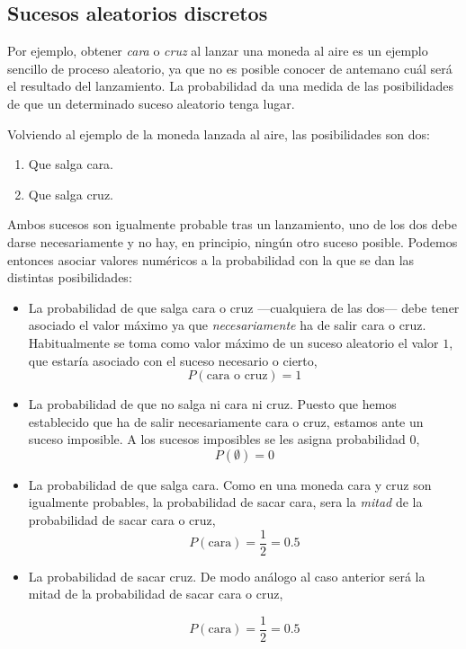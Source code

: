 \subsection{Sucesos aleatorios discretos}
Por ejemplo, obtener \emph{cara} o \emph{cruz} al lanzar una moneda al aire es un ejemplo sencillo de proceso aleatorio, ya que no es posible conocer de antemano cuál será el resultado del lanzamiento. La probabilidad da una medida de las posibilidades de que un determinado suceso aleatorio tenga lugar.

Volviendo al ejemplo de la moneda  lanzada al aire, las posibilidades son dos:
\begin{enumerate}
\item Que salga cara.
\item Que salga cruz.
\end{enumerate}
Ambos sucesos son igualmente probable tras un lanzamiento, uno de los dos debe darse necesariamente y no hay, en principio, ningún otro suceso posible. Podemos entonces asociar valores numéricos a la probabilidad con la que se dan las distintas posibilidades:
\begin{itemize}
\item La probabilidad de que salga cara o cruz ---cualquiera de las dos--- debe tener asociado el valor máximo ya que \emph{necesariamente} ha de salir cara o cruz.  Habitualmente se toma como valor máximo de un suceso aleatorio el valor $1$, que estaría asociado con el suceso necesario o cierto,
\begin{equation*}
P(\text{cara o cruz}) = 1
\end{equation*}

\item La probabilidad de que no salga ni cara ni cruz. Puesto que hemos establecido que ha de salir necesariamente cara o cruz, estamos ante un suceso imposible. A los sucesos imposibles se les asigna probabilidad $0$,
\begin{equation*}
P(\emptyset) = 0
\end{equation*}

\item La probabilidad de que salga cara. Como en una moneda cara y cruz son igualmente probables,  la probabilidad de sacar cara, sera la \emph{mitad} de la probabilidad de sacar cara o cruz,
\begin{equation*}
P(\text{cara})=\frac{1}{2}=0.5
\end{equation*}

\item La probabilidad de sacar cruz. De modo análogo al caso anterior será la mitad de la probabilidad de sacar cara o cruz, 

\begin{equation*}
P(\text{cara})=\frac{1}{2}=0.5
\end{equation*} 
\end{itemize}

